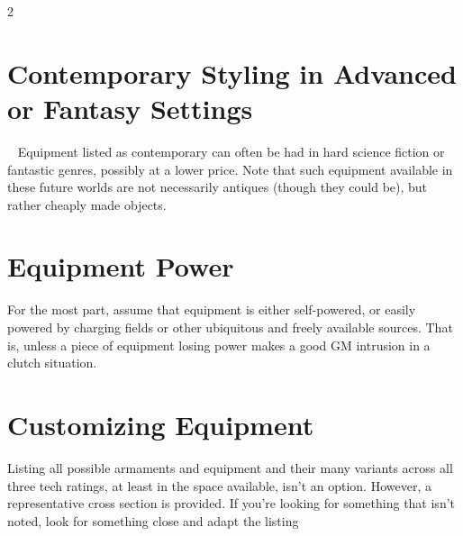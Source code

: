 \begin{multicols}{2}
\section{Contemporary Styling in Advanced or Fantasy Settings}
 
Equipment listed as contemporary can often be had in hard science fiction or fantastic genres, possibly at a lower price. Note that such equipment available in these future worlds are not necessarily antiques (though they could be), but rather cheaply made objects. 

\section{Equipment Power}

For the most part, assume that equipment is either self-powered, or easily powered by charging fields or other ubiquitous and freely available sources. That is, unless a piece of equipment losing power makes a good GM intrusion in a clutch situation.

\section{Customizing Equipment}

Listing all possible armaments and equipment and their many variants across all three tech ratings, at least in the space available, isn’t an option. However, a representative cross section is provided. If you’re looking for something that isn’t noted, look for something close and adapt the listing

\end{multicols}
